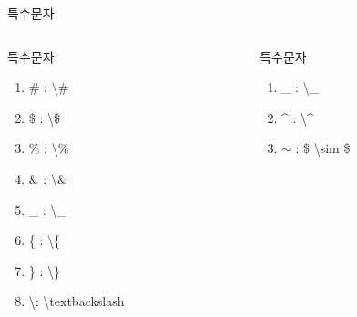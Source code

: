 \documentclass[ aspectratio=149,  10pt,blue,xcolor=pdftex,dvipsnames,table,handout,notes]{beamer}
\begin{document}
		\begin{frame}[t,allowframebreaks]{특수문자}

			\begin{columns}[t]
			\begin{column}{.4\textwidth}
			\begin{block} {특수문자}
			\begin{enumerate}
			\item \# : \textbackslash \# \\
			\item \$ : \textbackslash \$ \\
			\item \% : \textbackslash \% \\
			\item \& : \textbackslash \& \\
			\item \_ : \textbackslash \_ \\
			\item \{ : \textbackslash \{ \\
			\item \} : \textbackslash \} \\
			\item \textbackslash  : \textbackslash textbackslash
			\end{enumerate}
			\end{block}
			\end{column}

			\begin{column}{.4\textwidth}
			\begin{block} {특수문자}
			\begin{enumerate}
			\item \_ : \textbackslash \_ \\
			\item \^{} : \textbackslash \^{} \\
			\item $\sim$ : \$ \textbackslash sim \$
			\end{enumerate}
			\end{block}
			\end{column}

			\end{columns}
		\end{frame}
\end{document}
